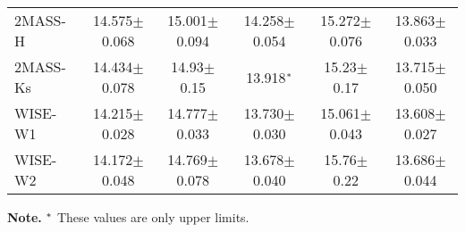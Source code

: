 \documentclass[fleqn,usenatbib]{mnras}
\begin{document}
\begin{table*}
\begin{center}
\begin{tabular}{lccccc}
2MASS-H  & 14.575$\pm$0.068 & 15.001$\pm$0.094 & 14.258$\pm$0.054 & 15.272$\pm$0.076 & 13.863$\pm$0.033 \\
2MASS-Ks & 14.434$\pm$0.078 & 14.93$\pm$0.15 & 13.918$^{\rm *}$ & 15.23$\pm$0.17 & 13.715$\pm$0.050 \\
WISE-W1  & 14.215$\pm$0.028 & 14.777$\pm$0.033 & 13.730$\pm$0.030 & 15.061$\pm$0.043 & 13.608$\pm$0.027 \\
WISE-W2  & 14.172$\pm$0.048 & 14.769$\pm$0.078 & 13.678$\pm$0.040 & 15.76$\pm$0.22 & 13.686$\pm$0.044 \\

\hline %
\end{tabular}
\begin{list}{}{}
\item[]{\scriptsize{{\bf Note.} $^{\rm *}$ These values are only upper limits.}}
\end{list}
\end{center}
\end{table*}
\end{document}
